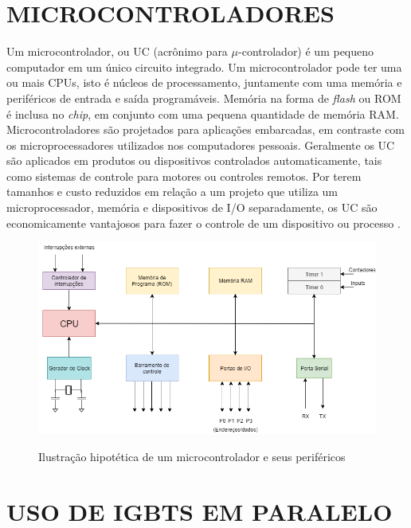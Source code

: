 \section{MICROCONTROLADORES}
\label{sec:micro}

Um microcontrolador, ou UC (acrônimo para   $\mu$-controlador) é um pequeno computador em um único circuito integrado. Um microcontrolador pode ter uma ou mais CPUs, isto é núcleos de processamento, juntamente com uma memória e periféricos de entrada e saída programáveis. Memória na forma de \textit{flash} ou ROM é inclusa no \textit{chip}, em conjunto com uma pequena quantidade de memória RAM. Microcontroladores são projetados para aplicações embarcadas, em contraste com os microprocessadores utilizados nos computadores pessoais. Geralmente os UC são aplicados em produtos ou dispositivos controlados automaticamente, tais como sistemas de controle para motores ou controles remotos. Por terem tamanhos e custo reduzidos em relação a um projeto que utiliza um microprocessador, memória e dispositivos de I/O separadamente, os UC são economicamente vantajosos para fazer o controle de um dispositivo ou processo \cite{Nicolosi}.


\begin{figure}[!htb]
    \centering
    \caption{Ilustração hipotética de um microcontrolador e seus periféricos}
    \includegraphics[width=1\textwidth]{./dados/figuras/diagarama_micro}
    \label{fig:figura-uc}
\end{figure}

\pagebreak 

\section{USO DE IGBTS EM PARALELO}
\label{sec:paralleligbt}


